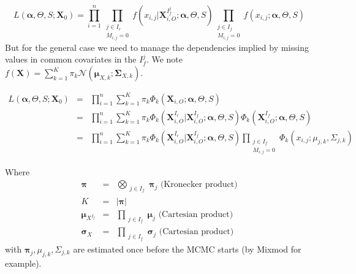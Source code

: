 \documentclass[12pt,a4paper]{report}
\begin{document}
		\begin{equation}
		L(\boldsymbol{\alpha},\Theta,S;\boldsymbol{X}_0)=\prod_{i=1}^n\prod_{\substack{j \in I_r \\ M_{i,j}=0}}f(x_{i,j}|\boldsymbol{X}^{I_f^j}_{i,O};\boldsymbol{\alpha},\Theta,S)\prod_{\substack{j \in I_f \\ M_{i,j}=0}}f(x_{i,j};\boldsymbol{\alpha},\Theta,S) \label{simplemisslik}
\end{equation}		 
		But for the general case we need to manage the dependencies implied by missing values in common covariates in the $I_f^j$.
		We note $f(\boldsymbol{X})=\sum_{k=1}^K\pi_k \mathcal{N}(\boldsymbol{\mu}_{X,k};\boldsymbol{\Sigma}_{X,k})$.
		
\begin{eqnarray}
L(\boldsymbol{\alpha},\Theta,S;\boldsymbol{X}_0)&=&\prod_{i=1}^n\sum_{k=1}^{K} \pi_{k} \Phi_k(\boldsymbol{X}_{i,O};\boldsymbol{\alpha},\Theta,S)\\
&=&\prod_{i=1}^n\sum_{k=1}^{K} \pi_{k} \Phi_k(\boldsymbol{X}_{i,O}^{I_r}|\boldsymbol{X}_{i,O}^{I_f};\boldsymbol{\alpha},\Theta,S)\Phi_k(\boldsymbol{X}_{i,O}^{I_f};\boldsymbol{\alpha},\Theta,S)\\
&=&\prod_{i=1}^n\sum_{k=1}^{K} \pi_{k} \Phi_k(\boldsymbol{X}_{i,O}^{I_r}|\boldsymbol{X}_{i,O}^{I_f};\boldsymbol{\alpha},\Theta,S)\prod_{\substack{j \in I_f \\ M_{i,j}=0}}\Phi_k(x_{i,j};\mu_{j,k},\Sigma_{j,k}) \label{liklihoodmissglobal}
\end{eqnarray}		

Where	
\begin{eqnarray}
	\boldsymbol{\pi}&=&\bigotimes_{\substack{j \in I_f }} \boldsymbol{\pi}_j \textrm{ (Kronecker product)}\\
	K&=& |\boldsymbol{\pi}| \\
	\boldsymbol{\mu}_{X^{I_f}}&=&  \prod_{\substack{j \in I_f}}\boldsymbol{\mu}_{j} \textrm{ (Cartesian product) } \\	
	\boldsymbol{\sigma}_{X}&=&\prod_{\substack{j \in I_f}}\boldsymbol{\sigma}_{j} \textrm{ (Cartesian product) }
\end{eqnarray}
		with $ \boldsymbol{\pi}_j, \mu_{j,k},\Sigma_{j,k}$ are estimated once before the MCMC starts (by Mixmod for example).
		
\end{document}
